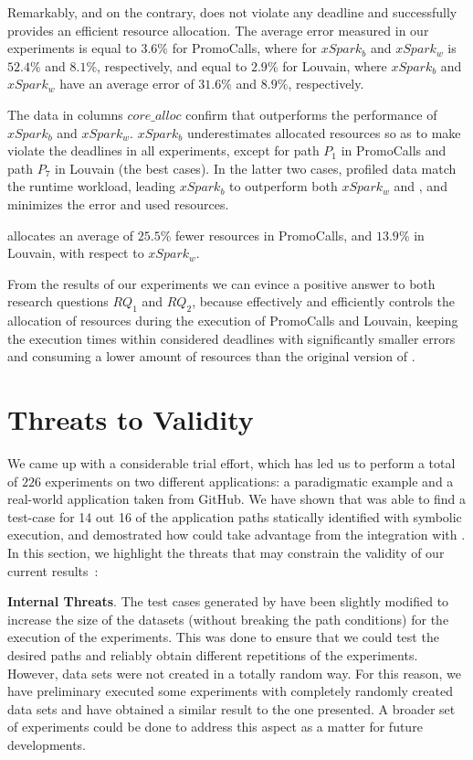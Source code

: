Remarkably, and on the contrary, \tool does not violate any deadline and successfully provides an efficient resource allocation. The average error measured in our experiments is equal to $3.6\%$ for PromoCalls, where for $xSpark_b$ and $xSpark_w$ is $52.4\%$ and $8.1\%$, respectively, and equal to $2.9\%$ for Louvain, where $xSpark_b$ and $xSpark_w$ have an average error of $31.6\%$ and $8.9\%$, respectively.

The data in columns $core\_alloc$ confirm that \tool outperforms the performance of $xSpark_b$ and $xSpark_w$. $xSpark_b$ underestimates allocated resources so as to make \cSpark violate the deadlines in all experiments, except for path $P_1$ in PromoCalls and path $P_7$ in Louvain (the best cases). In the latter two cases, profiled data match the runtime workload, leading $xSpark_b$ to outperform both $xSpark_w$ and \tool, and minimizes the error and used resources. 

\tool allocates an average of $25.5\%$ fewer resources in PromoCalls, and $13.9\%$ in Louvain, with respect to $xSpark_w$.

From the results of our experiments we can evince a positive answer to both research questions $RQ_1$ and $RQ_2$, because \tool effectively and efficiently controls the allocation of resources during the execution of PromoCalls and Louvain, keeping the execution times within considered deadlines with significantly smaller errors and consuming a lower amount of resources than the original version of \cSpark.

\section{Threats to Validity}
\label{sec:ThreatsToValidity}

We came up with a considerable trial effort, which has led us to perform a total of $226$ experiments on two different applications: a paradigmatic example and a real-world application taken from GitHub. We have shown that \dSymb was able to find a test-case for 14 out 16 of the application paths statically identified with symbolic execution, and demostrated how \cSpark could take advantage from the integration with \dSymb. In this section, we highlight the threats that may constrain the validity of our current results~\cite{wohlin2006empirical}:

\textbf{Internal Threats}.  The test cases generated by \dSymb have been slightly modified to increase the size of the datasets (without breaking the path conditions) for the execution of the experiments. This was done to ensure that we could test the desired paths and reliably obtain different repetitions of the experiments. However, data sets were not created in a totally random way. For this reason, we have preliminary executed some experiments with completely randomly created data sets and have obtained a similar result to the one presented.
A broader set of experiments could be done to address this aspect as a matter for future developments.

